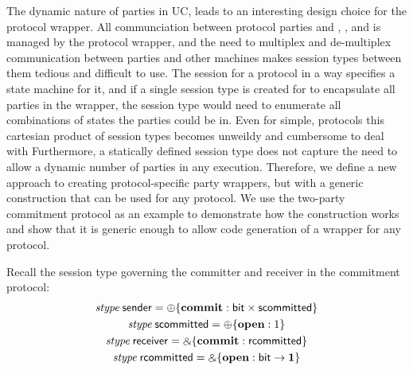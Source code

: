 The dynamic nature of parties in UC, leads to an interesting design choice for the protocol wrapper.
All communciation between protocol parties and \Z, \F, and \A is managed by the protocol wrapper, and the need to multiplex and de-multiplex communication between parties and other machines makes session types between them tedious and difficult to use.
The session for a protocol in a way specifies a state machine for it, and if a single session type is created for to encapsulate all parties in the wrapper, the session type would need to enumerate all combinations of states the parties could be in.
Even for simple, protocols this cartesian product of session types becomes unweildy and cumbersome to deal with 
Furthermore, a statically defined session type does not capture the need to allow a dynamic number of parties in any execution.
Therefore, we define a new approach to creating protocol-specific party wrappers, but with a generic construction that can be used for any protocol.
We use the two-party commitment protocol as an example to demonstrate how the construction works and show that it is generic enough to allow code generation of a wrapper for any protocol.

Recall the session type governing the committer and receiver in the commitment protocol:
\begin{gather}
	\mbox{\it stype} \; \mathsf{sender} = \oplus \{ \mathbf{commit} : \mathsf{bit} \times \mathsf{scommitted} \} \\
	\mbox{\it stype} \; \mathsf{scommitted} = \oplus \{ \mathbf{open} : 1 \} \\
	\mbox{\it stype} \; \mathsf{receiver} = \mathbin{\binampersand} \{ \mathbf{commit} : \mathsf{rcommitted} \} \\
	\mbox{\it stype} \; \mathsf{rcommitted} = \mathbin{\binampersand} \{ \mathbf{open} : \mathsf{bit} \rightarrow \mathbf{1} \}
\end{gather}

